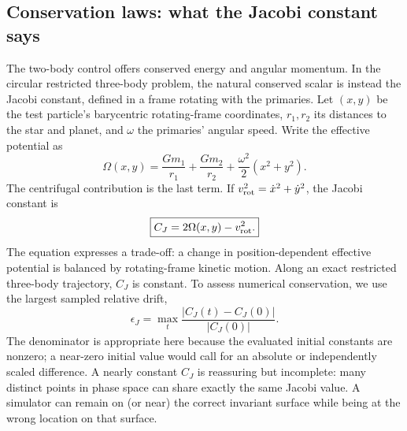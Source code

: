 \documentclass[10pt,letterpaper,twocolumn]{article}
\begin{document}
\subsection{Conservation laws: what the Jacobi constant says}
The two-body control offers conserved energy and angular momentum. In the circular restricted three-body problem, the natural conserved scalar is instead the Jacobi constant, defined in a frame rotating with the primaries. Let $(x,y)$ be the test particle's barycentric rotating-frame coordinates, $r_1,r_2$ its distances to the star and planet, and $\omega$ the primaries' angular speed. Write the effective potential as
\begin{equation}
 \Omega(x,y)=\frac{Gm_1}{r_1}+\frac{Gm_2}{r_2}
 +\frac{\omega^2}{2}(x^2+y^2).
\end{equation}
The centrifugal contribution is the last term. If $v_{\rm rot}^2=\dot x^2+\dot y^2$, the Jacobi constant is
\begin{equation}\label{eq:jacobi}
 \boxed{C_J=2\Omega(x,y)-v_{\rm rot}^2.}
\end{equation}
The equation expresses a trade-off: a change in position-dependent effective potential is balanced by rotating-frame kinetic motion. Along an exact restricted three-body trajectory, $C_J$ is constant. To assess numerical conservation, we use the largest sampled relative drift,
\begin{equation}
 \epsilon_J=\max_t\frac{|C_J(t)-C_J(0)|}{|C_J(0)|}.
\end{equation}
The denominator is appropriate here because the evaluated initial constants are nonzero; a near-zero initial value would call for an absolute or independently scaled difference. A nearly constant $C_J$ is reassuring but incomplete: many distinct points in phase space can share exactly the same Jacobi value. A simulator can remain on (or near) the correct invariant surface while being at the wrong location on that surface.
\end{document}
